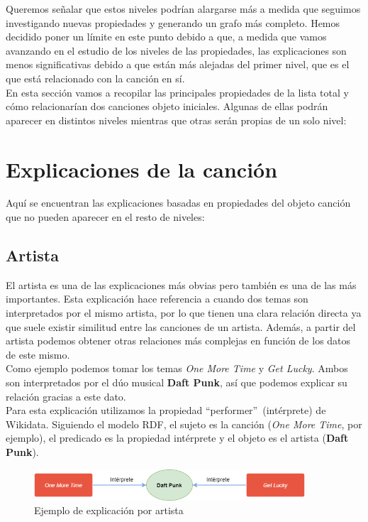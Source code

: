 Queremos señalar que estos niveles podrían alargarse más a medida que seguimos investigando nuevas propiedades y generando un grafo más completo. Hemos decidido poner un límite en este punto debido a que, a medida que vamos avanzando en el estudio de los niveles de las propiedades, las explicaciones son menos significativas debido a que están más alejadas del primer nivel, que es el que está relacionado con la canción en sí.\\

En esta sección vamos a recopilar las principales propiedades de la lista total y cómo relacionarían dos canciones objeto iniciales. Algunas de ellas podrán aparecer en distintos niveles mientras que otras serán propias de un solo nivel:\\

\section{Explicaciones de la canción}

Aquí se encuentran las explicaciones basadas en propiedades del objeto canción que no pueden aparecer en el resto de niveles:

\subsection*{Artista}

El artista es una de las explicaciones más obvias pero también es una de las más importantes. Esta explicación hace referencia a cuando dos temas son interpretados por el mismo artista, por lo que tienen una clara relación directa ya que suele existir similitud entre las canciones de un artista. Además, a partir del artista podemos obtener otras relaciones más complejas en función de los datos de este mismo.\\

Como ejemplo podemos tomar los temas \textit{One More Time} y \textit{Get Lucky}. Ambos son interpretados por el dúo musical \textbf{Daft Punk}, así que podemos explicar su relación gracias a este dato.\\

Para esta explicación utilizamos la propiedad ``performer''~(intérprete) de Wikidata. Siguiendo el modelo RDF, el sujeto es la canción (\textit{One More Time}, por ejemplo), el predicado es la propiedad intérprete y el objeto es el artista (\textbf{Daft Punk}).\\

\begin{figure}[h!]
	\centering
	\includegraphics[width = 0.9\textwidth]{Imagenes/Bitmap/Artista ejemplo.png}
	\caption{Ejemplo de explicación por artista}
	\label{fig:sampleImage}
\end{figure}

